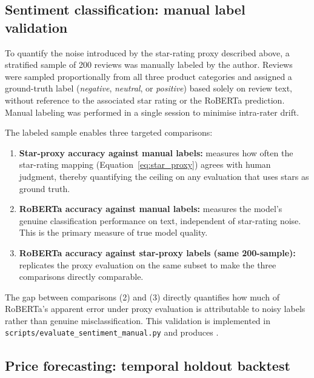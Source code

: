 \subsection{Sentiment classification: manual label validation}
\label{subsec:manual_eval}

To quantify the noise introduced by the star-rating proxy described above, a stratified
sample of 200 reviews was manually labeled by the author. Reviews were sampled
proportionally from all three product categories and assigned a ground-truth label
(\textit{negative}, \textit{neutral}, or \textit{positive}) based solely on review
text, without reference to the associated star rating or the RoBERTa prediction.
Manual labeling was performed in a single session to minimise intra-rater drift.

The labeled sample enables three targeted comparisons:

\begin{enumerate}
    \item \textbf{Star-proxy accuracy against manual labels:} measures how often the
    star-rating mapping (Equation~\ref{eq:star_proxy}) agrees with human judgment,
    thereby quantifying the ceiling on any evaluation that uses stars as ground truth.

    \item \textbf{RoBERTa accuracy against manual labels:} measures the model's genuine
    classification performance on text, independent of star-rating noise.
    This is the primary measure of true model quality.

    \item \textbf{RoBERTa accuracy against star-proxy labels (same 200-sample):}
    replicates the proxy evaluation on the same subset to make the three comparisons
    directly comparable.
\end{enumerate}

The gap between comparisons (2) and (3) directly quantifies how much of RoBERTa's
apparent error under proxy evaluation is attributable to noisy labels rather than
genuine misclassification. This validation is implemented in
\texttt{scripts/evaluate\_sentiment\_manual.py} and produces
.

\subsection{Price forecasting: temporal holdout backtest}

